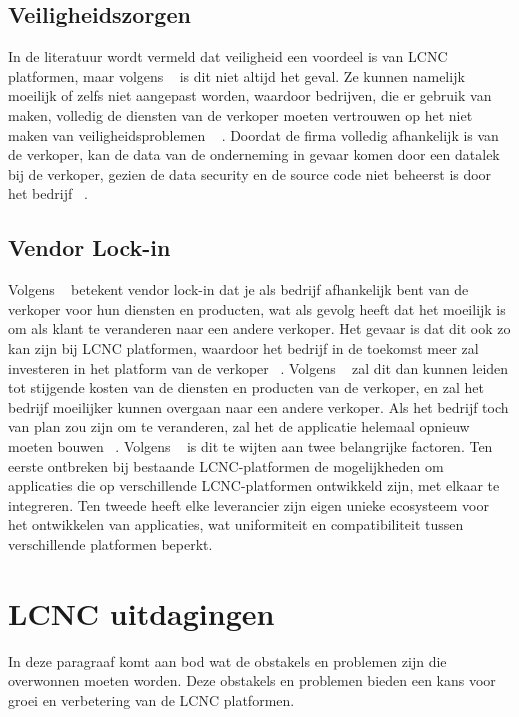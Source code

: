 \subsection*{Veiligheidszorgen}
\label{subsec:veiligheidszorgen}
In de literatuur wordt vermeld dat veiligheid een voordeel is van LCNC platformen, maar volgens ~\textcite{Yan2021} is dit niet altijd het geval. 
Ze kunnen namelijk moeilijk of zelfs niet aangepast worden, waardoor bedrijven, die er gebruik van maken, volledig de diensten van de verkoper 
moeten vertrouwen op het niet maken van veiligheidsproblemen ~\autocite{Yan2021} \autocite{Rokis_2022}. 
Doordat de firma volledig afhankelijk is van de verkoper, kan de data van de onderneming in gevaar komen door een datalek bij de verkoper, gezien 
de data security en de source code niet beheerst is door het bedrijf ~\autocite{Yan2021}.

\subsection*{Vendor Lock-in}
\label{subsec:technische-schulden}
Volgens ~\textcite{Yan2021} betekent vendor lock-in dat je als bedrijf afhankelijk bent van de verkoper voor hun diensten en producten, 
wat als gevolg heeft dat het moeilijk is om als klant te veranderen naar een andere verkoper. Het gevaar is dat dit ook zo kan zijn bij LCNC platformen, 
waardoor het bedrijf in de toekomst meer zal investeren in het platform van de verkoper ~\autocite{Yan2021}. 
Volgens ~\textcite{Yan2021} zal dit dan kunnen leiden tot stijgende kosten van de diensten en producten van de verkoper, 
en zal het bedrijf moeilijker kunnen overgaan naar een andere verkoper. Als het bedrijf toch van plan zou zijn om te veranderen, 
zal het de applicatie helemaal opnieuw moeten bouwen ~\autocite{Sufi_2023}.  
Volgens ~\textcite{Sufi_2023} is dit te wijten aan twee belangrijke factoren. 
Ten eerste ontbreken bij bestaande LCNC-platformen de mogelijkheden om applicaties die op verschillende LCNC-platformen ontwikkeld zijn, met elkaar te integreren.
Ten tweede heeft elke leverancier zijn eigen unieke ecosysteem voor het ontwikkelen van applicaties, wat uniformiteit en compatibiliteit tussen verschillende platformen beperkt.


\section{LCNC uitdagingen}
\label{sec:lcnc-uitdagingen}
In deze paragraaf komt aan bod wat de obstakels en problemen zijn die overwonnen moeten worden. Deze obstakels en problemen bieden een kans voor groei en
verbetering van de LCNC platformen.
